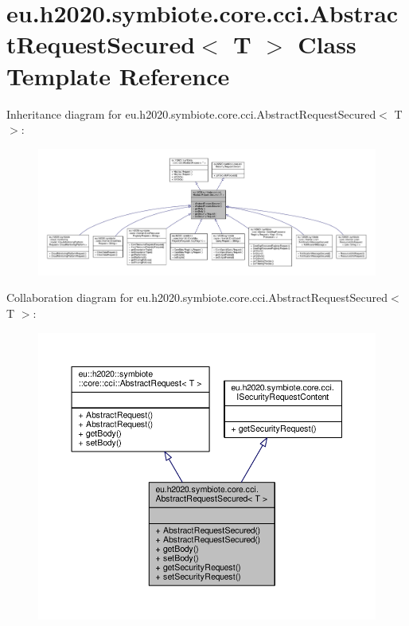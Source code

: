 \hypertarget{classeu_1_1h2020_1_1symbiote_1_1core_1_1cci_1_1AbstractRequestSecured}{}\section{eu.\+h2020.\+symbiote.\+core.\+cci.\+Abstract\+Request\+Secured$<$ T $>$ Class Template Reference}
\label{classeu_1_1h2020_1_1symbiote_1_1core_1_1cci_1_1AbstractRequestSecured}


Inheritance diagram for eu.\+h2020.\+symbiote.\+core.\+cci.\+Abstract\+Request\+Secured$<$ T $>$\+:
\nopagebreak
\begin{figure}[H]
\begin{center}
\leavevmode
\includegraphics[width=350pt]{classeu_1_1h2020_1_1symbiote_1_1core_1_1cci_1_1AbstractRequestSecured__inherit__graph}
\end{center}
\end{figure}


Collaboration diagram for eu.\+h2020.\+symbiote.\+core.\+cci.\+Abstract\+Request\+Secured$<$ T $>$\+:
\nopagebreak
\begin{figure}[H]
\begin{center}
\leavevmode
\includegraphics[width=350pt]{classeu_1_1h2020_1_1symbiote_1_1core_1_1cci_1_1AbstractRequestSecured__coll__graph}
\end{center}
\end{figure}
